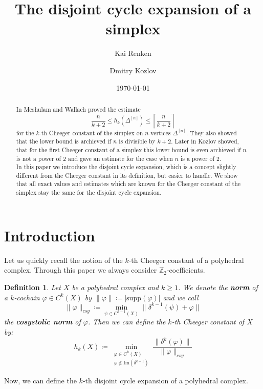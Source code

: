 \documentclass{article}
\title{The disjoint cycle expansion of a simplex}
\author{Kai Renken \and Dmitry Kozlov}
\date{\today}
\newcommand{\supp}{\mathrm{supp}}
\newcommand{\im}{\mathrm{Im}}
\newtheorem{defi}{Definition}[section]
\begin{document}
\maketitle


\begin{abstract}
In \cite{3} Meshulam and Wallach proved the estimate
\[
\frac{n}{k+2}\leq h_k(\Delta^{[n]})\leq\left\lceil\frac{n}{k+2}\right\rceil
\]
for the $k$-th Cheeger constant of the simplex on $n$-vertices $\Delta^{[n]}$. They also showed that the lower bound is archieved if $n$ is divisible by $k+2$. Later in \cite{2} Kozlov showed, that for the first Cheeger constant of a simplex this lower bound is even archieved if $n$ is not a power of $2$ and gave an estimate for the case when $n$ is a power of $2$.\\
In this paper we introduce the disjoint cycle expansion, which is a concept slightly different from the Cheeger constant in its definition, but easier to handle. We show that all exact values and estimates which are known for the Cheeger constant of the simplex stay the same for the disjoint cycle expansion. 
\end{abstract}

\section{Introduction}

Let us quickly recall the notion of the $k$-th Cheeger constant of a polyhedral complex. Through this paper we always consider $\mathbb{Z}_2$-coefficients.\\

\begin{defi}
Let $X$ be a polyhedral complex and $k\geq 1$. We denote the \textbf{norm} of a $k$-cochain $\varphi\in C^k(X)$ by $\|\varphi\|\coloneqq |\supp(\varphi)|$ and we call
\[
\|\varphi\|_{csy}\coloneqq\min\limits_{\psi\in C^{k-1}(X)}\|\delta^{k-1}(\psi)+\varphi\|
\]
the \textbf{cosystolic norm} of $\varphi$. Then we can define the $k$-th Cheeger constant of $X$ by:
\[
h_k(X)\coloneqq\min_{\substack{\varphi\in C^k(X)\\\varphi\notin\im(\delta^{k-1})}}\frac{\|\delta^k(\varphi)\|}{\|\varphi\|_{csy}}
\]
\end{defi}

Now, we can define the $k$-th disjoint cycle expansion of a polyhedral complex.
\end{document}
